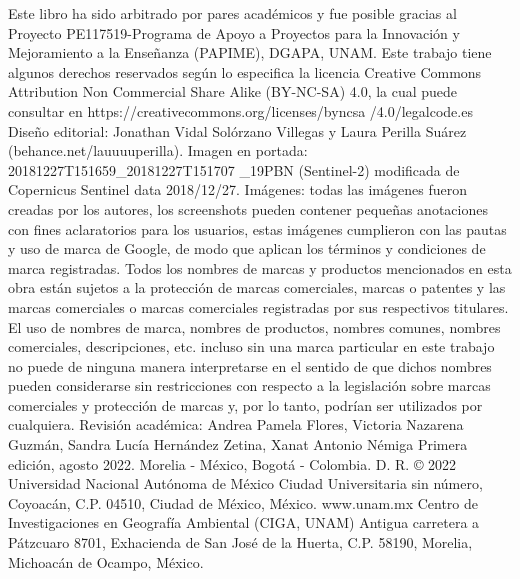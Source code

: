\setlength{\columnsep}{25pt}
\begin{multicols}{2}
    {\scriptsize Este libro ha sido arbitrado por pares académicos y fue posible gracias al Proyecto PE117519-Programa de Apoyo a Proyectos para la Innovación y Mejoramiento a la Enseñanza (PAPIME), DGAPA, UNAM.
    \newline Este trabajo tiene algunos derechos reservados según lo especifica la licencia Creative Commons Attribution Non Commercial Share Alike (BY-NC-SA) 4.0, la cual puede consultar en https://creativecommons.org/licenses/byncsa /4.0/legalcode.es
    \newline Diseño editorial: Jonathan Vidal Solórzano Villegas y Laura Perilla Suárez (behance.net/lauuuuperilla).
    \newline Imagen en portada: 20181227T151659\_20181227T151707 \_19PBN (Sentinel-2) modificada de Copernicus Sentinel data 2018/12/27. Imágenes: todas las imágenes fueron creadas por los autores, los screenshots pueden contener pequeñas anotaciones con fines aclaratorios para los usuarios, estas imágenes cumplieron con las pautas y uso de marca de Google, de modo que aplican los términos y condiciones de marca registradas. 
    \newline Todos los nombres de marcas y productos mencionados en esta obra están sujetos a la protección de marcas comerciales, marcas o patentes y las marcas comerciales o marcas comerciales registradas por sus respectivos titulares. El uso de nombres de marca, nombres de productos, nombres comunes, nombres comerciales, descripciones, etc. incluso sin una marca particular en este trabajo no puede de ninguna manera interpretarse en el sentido de que dichos nombres pueden considerarse sin restricciones con respecto a la legislación sobre marcas comerciales y protección de marcas y, por lo tanto, podrían ser utilizados por cualquiera.
    \newline Revisión académica: Andrea Pamela Flores, Victoria Nazarena Guzmán, Sandra Lucía Hernández Zetina, Xanat Antonio Némiga
    \linebreak
    \newline Primera edición, agosto 2022. Morelia - México, Bogotá - Colombia.  
    D. R. © 2022 Universidad Nacional Autónoma de México 
    Ciudad Universitaria sin número, Coyoacán, C.P. 04510, Ciudad de México, México.
    www.unam.mx
    \newline Centro de Investigaciones en Geografía Ambiental (CIGA, UNAM) 
    Antigua carretera a Pátzcuaro 8701, Exhacienda de San José de la Huerta, C.P. 58190, Morelia, Michoacán de Ocampo, México.
}
\end{multicols}
